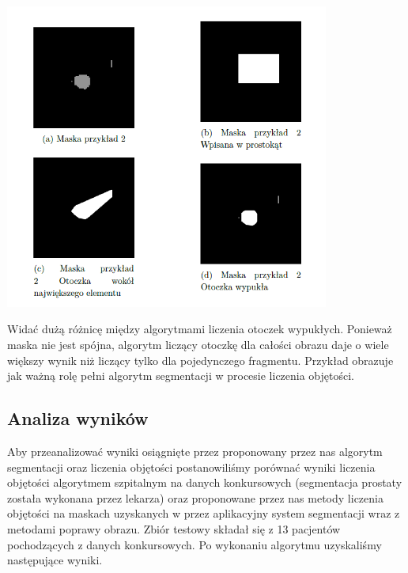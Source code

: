 \documentclass[a4paper,11pt,twoside]{report}
\theoremstyle{definition}
\begin{document}
\begin{minipage}[H]{\linewidth}
	\centering
	\includegraphics[width=0.8\textwidth]{Mask/segmentacja2.png}
	\label{przy2}
\end{minipage}

Widać dużą różnicę między algorytmami liczenia otoczek wypukłych. Ponieważ maska nie jest spójna, algorytm liczący otoczkę dla całości obrazu daje o wiele większy wynik niż liczący tylko dla pojedynczego fragmentu. Przykład obrazuje jak ważną rolę pełni algorytm segmentacji w procesie liczenia objętości.

\subsection{Analiza wyników}
Aby przeanalizować wyniki osiągnięte przez proponowany przez nas algorytm segmentacji oraz liczenia objętości postanowiliśmy porównać wyniki liczenia objętości algorytmem szpitalnym na danych konkursowych (segmentacja prostaty została wykonana przez lekarza) oraz proponowane przez nas metody liczenia objętości na maskach uzyskanych w przez aplikacyjny system segmentacji wraz z metodami poprawy obrazu. Zbiór testowy składał się z 13 pacjentów pochodzących z danych konkursowych. Po wykonaniu algorytmu uzyskaliśmy następujące wyniki.
\end{document}
